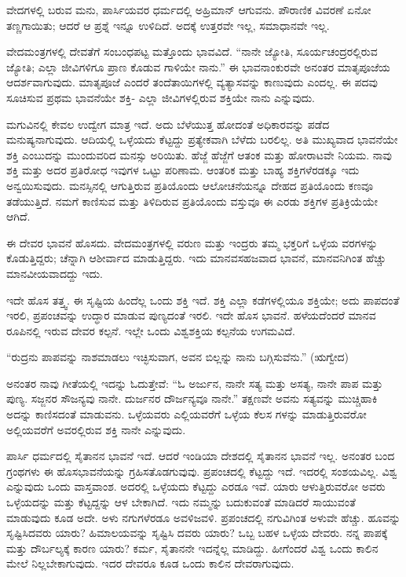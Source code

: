 ವೇದಗಳಲ್ಲಿ ಬರುವ ಮನು, ಪಾರ್ಸಿಯವರ ಧರ್ಮದಲ್ಲಿ ಅಹ್ರಿಮಾನ್​ ಆಗುವನು. ಪೌರಾಣಿಕ ವಿವರಣೆ ಏನೋ ತಣ್ಣಗಾಯಿತು; ಆದರೆ ಆ ಪ್ರಶ್ನೆ ಇನ್ನೂ ಉಳಿದಿದೆ. ಅದಕ್ಕೆ ಉತ್ತರವೇ ಇಲ್ಲ, ಸಮಾಧಾನವೇ ಇಲ್ಲ.

ವೇದಮಂತ್ರಗಳಲ್ಲಿ ದೇವತೆಗೆ ಸಂಬಂಧಪಟ್ಟ ಮತ್ತೊಂದು ಭಾವವಿದೆ. “ನಾನೇ ಜ್ಯೋತಿ, ಸೂರ್ಯಚಂದ್ರರಲ್ಲಿರುವ ಜ್ಯೋತಿ; ಎಲ್ಲಾ ಜೀವಿಗಳಿಗೂ ಪ್ರಾಣ ಕೊಡುವ ಗಾಳಿಯೇ ನಾನು.” ಈ ಭಾವನಾಂಕುರವೇ ಅನಂತರ ಮಾತೃಪೂಜೆಯ ಆದರ್ಶವಾಗುವುದು. ಮಾತೃಪೂಜೆ ಎಂದರೆ ತಂದೆತಾಯಿಗಳಲ್ಲಿ ವ್ಯತ್ಯಾಸವನ್ನು ಕಾಣುವುದು ಎಂದಲ್ಲ. ಈ ಪದವು ಸೂಚಿಸುವ ಪ್ರಥಮ ಭಾವನೆಯೇ ಶಕ್ತಿ- ಎಲ್ಲಾ ಜೀವಿಗಳಲ್ಲಿರುವ ಶಕ್ತಿಯೇ ನಾನು ಎನ್ನುವುದು.

ಮಗುವಿನಲ್ಲಿ ಕೇವಲ ಉದ್ವೇಗ ಮಾತ್ರ ಇದೆ. ಅದು ಬೆಳೆಯುತ್ತ ಹೋದಂತೆ ಅಧಿಕಾರವನ್ನು ಪಡೆದ ಮನುಷ್ಯನಾಗುವುದು. ಆದಿಯಲ್ಲಿ ಒಳ್ಳೆಯದು ಕೆಟ್ಟದ್ದು ಪ್ರತ್ಯೇಕವಾಗಿ ಬೆಳೆದು ಬರಲಿಲ್ಲ. ಅತಿ ಮುಖ್ಯವಾದ ಭಾವನೆಯೇ ಶಕ್ತಿ ಎಂಬುದನ್ನು ಮುಂದುವರಿದ ಮನಸ್ಸು ಅರಿಯಿತು. ಹೆಜ್ಜೆ ಹೆಜ್ಜೆಗೆ ಆತಂಕ ಮತ್ತು ಹೋರಾಟವೇ ನಿಯಮ. ನಾವು ಶಕ್ತಿ ಮತ್ತು ಅದರ ಪ್ರತಿರೋಧ ಇವುಗಳ ಒಟ್ಟು ಪರಿಣಾಮ. ಆಂತರಿಕ ಮತ್ತು ಬಾಹ್ಯ ಶಕ್ತಿಗಳೆರಡಕ್ಕೂ ಇದು ಅನ್ವಯಿಸುವುದು. ಮನಸ್ಸಿನಲ್ಲಿ ಆಗುತ್ತಿರುವ ಪ್ರತಿಯೊಂದು ಆಲೋಚನೆಯನ್ನೂ ದೇಹದ ಪ್ರತಿಯೊಂದು ಕಣವೂ ತಡೆಯುತ್ತಿದೆ. ನಮಗೆ ಕಾಣಿಸುವ ಮತ್ತು ತಿಳಿದಿರುವ ಪ್ರತಿಯೊಂದು ವಸ್ತುವೂ ಈ ಎರಡು ಶಕ್ತಿಗಳ ಪ್ರತಿಕ್ರಿಯೆಯೇ ಆಗಿದೆ.

ಈ ದೇವರ ಭಾವನೆ ಹೊಸದು. ವೇದಮಂತ್ರಗಳಲ್ಲಿ ವರುಣ ಮತ್ತು ಇಂದ್ರರು ತಮ್ಮ ಭಕ್ತರಿಗೆ ಒಳ್ಳೆಯ ವರಗಳನ್ನು ಕೊಡುತ್ತಿದ್ದರು; ಚೆನ್ನಾಗಿ ಆಶೀರ್ವಾದ ಮಾಡುತ್ತಿದ್ದರು. ಇದು ಮಾನವಸಹಜವಾದ ಭಾವನೆ, ಮಾನವನಿಗಿಂತ ಹೆಚ್ಚು ಮಾನವೀಯವಾದದ್ದು ಇದು.

ಇದೇ ಹೊಸ ತತ್ತ್ವ. ಈ ಸೃಷ್ಟಿಯ ಹಿಂದೆಲ್ಲ ಒಂದು ಶಕ್ತಿ ಇದೆ. ಶಕ್ತಿ ಎಲ್ಲಾ ಕಡೆಗಳಲ್ಲಿಯೂ ಶಕ್ತಿಯೇ; ಅದು ಪಾಪದಂತೆ ಇರಲಿ, ಪ್ರಪಂಚವನ್ನು ಉದ್ಧಾರ ಮಾಡುವ ಪುಣ್ಯದಂತೆ ಇರಲಿ. ಇದೇ ಹೊಸ ಭಾವನೆ. ಹಳೆಯದೆಂದರೆ ಮಾನವ ರೂಪಿನಲ್ಲಿ ಇರುವ ದೇವರ ಕಲ್ಪನೆ. ಇಲ್ಲೇ ಒಂದು ವಿಶ್ವಶಕ್ತಿಯ ಕಲ್ಪನೆಯ ಉಗಮವಿದೆ.

“ರುದ್ರನು ಪಾಪವನ್ನು ನಾಶಮಾಡಲು ಇಚ್ಛಿಸುವಾಗ, ಅವನ ಬಿಲ್ಲನ್ನು ನಾನು ಬಗ್ಗಿಸುವೆನು.” (ಋಗ್ವೇದ)

ಅನಂತರ ನಾವು ಗೀತೆಯಲ್ಲಿ ಇದನ್ನು ಓದುತ್ತೇವೆ: “ಓ ಅರ್ಜುನ, ನಾನೇ ಸತ್ಯ ಮತ್ತು ಅಸತ್ಯ, ನಾನೇ ಪಾಪ ಮತ್ತು ಪುಣ್ಯ. ಸಜ್ಜನರ ಸೌಜನ್ಯವು ನಾನೇ. ದುರ್ಜನರ ದೌರ್ಜನ್ಯವೂ ನಾನೇ.” ತಕ್ಷಣವೇ ಅವನು ಸತ್ಯವನ್ನು ಮುಚ್ಚಿಹಾಕಿ ಅದನ್ನು ಕಾಣಿಸದಂತೆ ಮಾಡುವನು. ಒಳ್ಳೆಯವರು ಎಲ್ಲಿಯವರೆಗೆ ಒಳ್ಳೆಯ ಕೆಲಸ ಗಳನ್ನು ಮಾಡುತ್ತಿರುವರೋ ಅಲ್ಲಿಯವರೆಗೆ ಅವರಲ್ಲಿರುವ ಶಕ್ತಿ ನಾನೇ ಎನ್ನುವುದು.

ಪಾರ್ಸಿ ಧರ್ಮದಲ್ಲಿ ಸೈತಾನನ ಭಾವನೆ ಇದೆ. ಆದರೆ ಇಂಡಿಯಾ ದೇಶದಲ್ಲಿ ಸೈತಾನನ ಭಾವನೆ ಇಲ್ಲ. ಅನಂತರ ಬಂದ ಗ್ರಂಥಗಳು ಈ ಹೊಸಭಾವನೆಯನ್ನು ಗ್ರಹಿಸತೊಡಗುವುವು. ಪ್ರಪಂಚದಲ್ಲಿ ಕೆಟ್ಟದ್ದು ಇದೆ. ಇದರಲ್ಲಿ ಸಂಶಯವಿಲ್ಲ. ವಿಶ್ವ ಎನ್ನುವುದು ಒಂದು ವಾಸ್ತವಾಂಶ. ಅದರಲ್ಲಿ ಒಳ್ಳೆಯದು ಕೆಟ್ಟದ್ದು ಎರಡೂ ಇವೆ. ಯಾರು ಆಳುತ್ತಿರುವರೋ ಅವರು ಒಳ್ಳೆಯದನ್ನು ಮತ್ತು ಕೆಟ್ಟದ್ದನ್ನು ಆಳ ಬೇಕಾಗಿದೆ. ಇದು ನಮ್ಮನ್ನು ಬದುಕುವಂತೆ ಮಾಡಿದರೆ ಸಾಯುವಂತೆ ಮಾಡುವುದು ಕೂಡ ಅದೇ. ಅಳು ನಗುಗಳೆರಡೂ ಅವಳಿಜವಳಿ. ಪ್ರಪಂಚದಲ್ಲಿ ನಗುವಿಗಿಂತ ಅಳುವೇ ಹೆಚ್ಚು. ಹೂವನ್ನು ಸೃಷ್ಟಿಸಿದವರು ಯಾರು? ಹಿಮಾಲಯವನ್ನು ಸೃಷ್ಟಿಸಿ ದವರು ಯಾರು? ಒಬ್ಬ ಬಹಳ ಒಳ್ಳೆಯ ದೇವರು. ನನ್ನ ಪಾಪಕ್ಕೆ ಮತ್ತು ದೌರ್ಬಲ್ಯಕ್ಕೆ ಕಾರಣ ಯಾರು? ಕರ್ಮ, ಸೈತಾನನೇ ಇದನ್ನೆಲ್ಲ ಮಾಡಿದ್ದು. ಹೀಗೆಂದರೆ ವಿಶ್ವ ಒಂದು ಕಾಲಿನ ಮೇಲೆ ನಿಲ್ಲಬೇಕಾಗುವುದು. ಇದರ ದೇವರೂ ಕೂಡ ಒಂದು ಕಾಲಿನ ದೇವರಾಗುವುದು.

